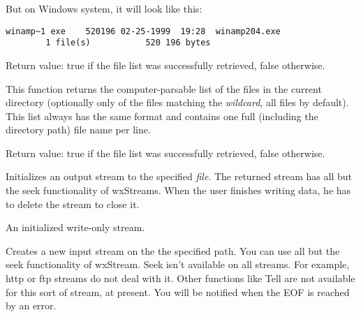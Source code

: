But on Windows system, it will look like this:

\begin{verbatim}
winamp~1 exe    520196 02-25-1999  19:28  winamp204.exe
        1 file(s)           520 196 bytes
\end{verbatim}

Return value: true if the file list was successfully retrieved, false
otherwise.




\label{wxftpgetfileslist}


This function returns the computer-parsable list of the files in the current
directory (optionally only of the files matching the {\it wildcard}, all files
by default). This list always has the same format and contains one full
(including the directory path) file name per line.

Return value: true if the file list was successfully retrieved, false
otherwise.



\label{wxftpgetoutputstream}


Initializes an output stream to the specified {\it file}. The returned
stream has all but the seek functionality of wxStreams. When the user finishes
writing data, he has to delete the stream to close it.


An initialized write-only stream.





\label{wxftpgetinputstream}


Creates a new input stream on the the specified path. You can use all but the seek
functionality of wxStream. Seek isn't available on all streams. For example,
http or ftp streams do not deal with it. Other functions like Tell
are not available for this sort of stream, at present.
You will be notified when the EOF is reached by an error.

